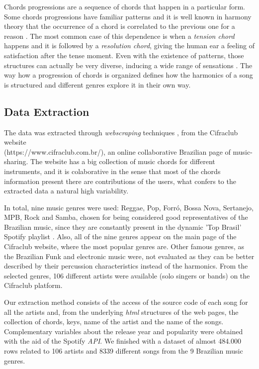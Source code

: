 \documentclass[twocolumn]{article}
\begin{document}
Chords progressions are a sequence of chords that happen
in a particular form. Some chords
progressions have familiar patterns and   
it is well known in harmony theory that 
the occurrence of a chord is correlated to the 
previous one for a reason \cite{Almada2012}. 
The most common case of this dependence is when a 
\textit{tension chord} happens and it is 
followed by a \textit{resolution chord}, 
giving the human ear a feeling of
satisfaction after the tense moment. 
Even with the existence of patterns, those structures 
can actually be very diverse, inducing a wide range
of sensations \cite{Rowe2005}. 
The way how a progression of 
chords is organized defines how the harmonics of a
song is structured and different genres explore it
in their own way. 

\subsection{Data Extraction}\label{subsec:data}

The data was extracted through \textit{webscraping} techniques 
\cite{Iacus2015},
from the Cifraclub website \\ 
(https://www.cifraclub.com.br/), an online
collaborative Brazilian page of music-sharing.
The website has a big collection of music chords 
for different instruments, and it is colaborative
in the sense that most of the chords information
present there are contributions of the users, 
what confers to the extracted data a natural
high variability. 

In total, nine music genres were used: 
Reggae, Pop, Forró, Bossa Nova, Sertanejo, MPB, 
Rock and Samba, chosen for being considered 
good representatives of the Brazilian music,
since they are constantly present in the dynamic
'Top Brasil' Spotify playlist \cite{Schettino2017}. 
Also, all of the nine genres appear on the main page of 
the Cifraclub website, where the most popular genres are. 
Other famous genres, as the Brazilian Funk and
electronic music were,
not evaluated as they can be better described by
their percussion characteristics instead of the 
harmonics. From the selected genres, 106 
different artists were available (solo singers or bands) on the Cifraclub platform. 

Our extraction method consists of the access of the source code of each 
song for all the artists and, from the 
underlying \textit{html} structures of the web pages,
the collection of chords, keys, name
of the artist and the name of the songs. 
Complementary variables about the release year and popularity were obtained with the aid of the Spotify \textit{API}.  We finished with a dataset of
almost 484.000 rows related to 106 artists and 
8339 different songs from the 9 Brazilian music 
genres.
\end{document}
